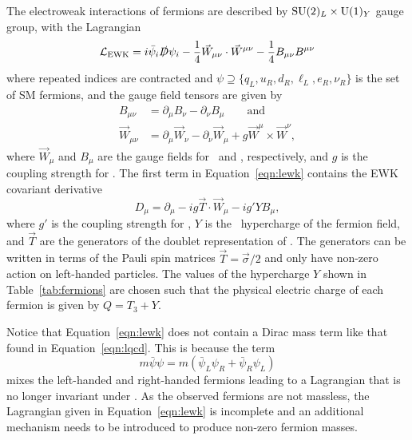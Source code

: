 The electroweak interactions of fermions are described by $\text{SU}(2)_L \times \text{U}(1)_Y$ gauge group, with the Lagrangian
\begin{equation}
  \label{eqn:lewk}
  \mathcal{L}_{\text{EWK}} = i \bar \psi_i \slashed D \psi_i - \frac{1}{4} \vec W_{\mu\nu} \cdot \vec W^{\mu\nu} - \frac{1}{4} B_{\mu\nu} B^{\mu\nu}
\end{equation}
where repeated indices are contracted and $\psi \supseteq \{q_L, u_R, d_R, \ell_L, e_R, \nu_R\}$ is the set of SM fermions, and the gauge field tensors are given by
\begin{align}
  B_{\mu\nu} & = \partial_\mu B_\nu - \partial_\nu B_\mu \qquad \text{and} \\
  \vec W_{\mu\nu} & = \partial_\mu \vec W_\nu - \partial_\nu \vec W_\mu + g \vec W^\mu \times \vec W^\nu ,
\end{align}
where $\vec W_\mu$ and $B_\mu$ are the gauge fields for \sutwo\ and \uone, respectively, and $g$ is the coupling strength for \sutwo.
The first term in Equation~\ref{eqn:lewk} contains the EWK covariant derivative
\begin{equation}
  D_{\mu} = \partial_\mu - i g \vec T \cdot \vec W_\mu - i g' Y B_\mu,
\end{equation}
where $g'$ is the coupling strength for \uone,
$Y$ is the \uone\ hypercharge of the fermion field,
and $\vec T$ are the generators of the doublet representation of \sutwo.
The generators can be written in terms of the Pauli spin matrices $\vec T = \vec \sigma / 2$ and only have non-zero action on left-handed particles. %
The values of the hypercharge $Y$ shown in Table~\ref{tab:fermions} are chosen such that the physical electric charge of each fermion is given by $Q =  T_3 + Y$.

Notice that Equation~\ref{eqn:lewk} does not contain a Dirac mass term like that found in Equation~\ref{eqn:lqcd}.
This is because the term
\begin{equation}
  m \bar \psi \psi = m \left( \bar \psi_L \psi_R + \bar \psi_R \psi_L \right)
\end{equation}
mixes the left-handed and right-handed fermions leading to a Lagrangian that is no longer invariant under \sutwo.
As the observed fermions are not massless, the Lagrangian given in Equation~\ref{eqn:lewk} is incomplete and an additional mechanism needs to be introduced to produce non-zero fermion masses.

